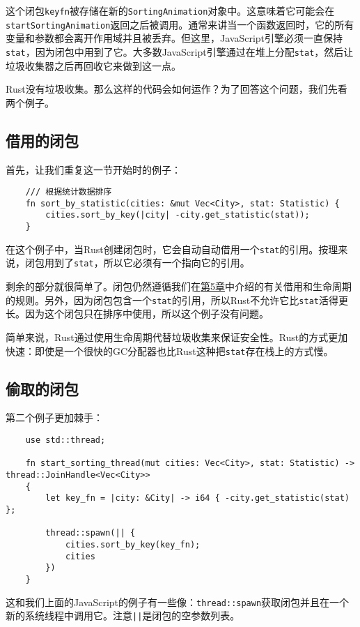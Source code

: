 这个闭包\texttt{keyfn}被存储在新的\texttt{SortingAnimation}对象中。这意味着它可能会在\texttt{startSortingAnimation}返回之后被调用。通常来讲当一个函数返回时，它的所有变量和参数都会离开作用域并且被丢弃。但这里，JavaScript引擎必须一直保持\texttt{stat}，因为闭包中用到了它。大多数JavaScript引擎通过在堆上分配\texttt{stat}，然后让垃圾收集器之后再回收它来做到这一点。

Rust没有垃圾收集。那么这样的代码会如何运作？为了回答这个问题，我们先看两个例子。

\subsection{借用的闭包}
首先，让我们重复这一节开始时的例子：
\begin{verbatim}
    /// 根据统计数据排序
    fn sort_by_statistic(cities: &mut Vec<City>, stat: Statistic) {
        cities.sort_by_key(|city| -city.get_statistic(stat));
    }
\end{verbatim}

在这个例子中，当Rust创建闭包时，它会自动自动借用一个\texttt{stat}的引用。按理来说，闭包用到了\texttt{stat}，所以它必须有一个指向它的引用。

剩余的部分就很简单了。闭包仍然遵循我们在\hyperref[ch05]{第5章}中介绍的有关借用和生命周期的规则。另外，因为闭包包含一个\texttt{stat}的引用，所以Rust不允许它比\texttt{stat}活得更长。因为这个闭包只在排序中使用，所以这个例子没有问题。

简单来说，Rust通过使用生命周期代替垃圾收集来保证安全性。Rust的方式更加快速：即使是一个很快的GC分配器也比Rust这种把\texttt{stat}存在栈上的方式慢。

\subsection{偷取的闭包}
第二个例子更加棘手：
\begin{verbatim}
    use std::thread;

    fn start_sorting_thread(mut cities: Vec<City>, stat: Statistic) -> thread::JoinHandle<Vec<City>>
    {
        let key_fn = |city: &City| -> i64 { -city.get_statistic(stat) };

        thread::spawn(|| {
            cities.sort_by_key(key_fn);
            cities
        })
    }
\end{verbatim}

这和我们上面的JavaScript的例子有一些像：\texttt{thread::spawn}获取闭包并且在一个新的系统线程中调用它。注意\texttt{||}是闭包的空参数列表。


